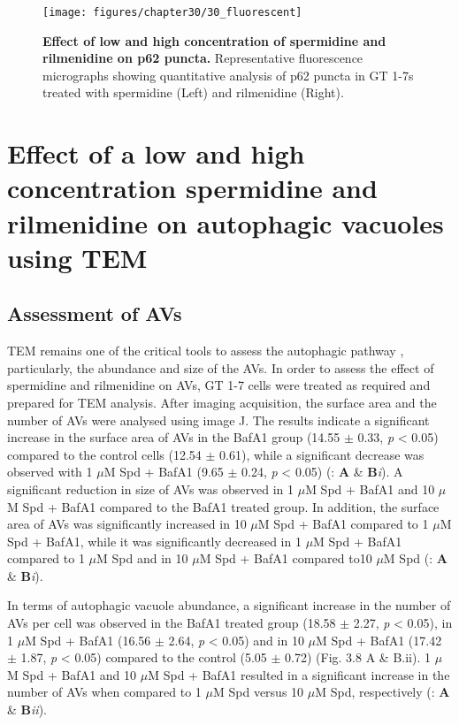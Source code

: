 {\begin{figure}[!htbp]
\center
  \texttt{[image: figures/chapter30/30\_fluorescent]}
  \caption[Effect of low and high concentration of spermidine and rilmenidine on p62 puncta - fluorescence micrographs]{\textbf{Effect of low and high concentration of spermidine and rilmenidine on p62 puncta.} Representative fluorescence micrographs showing quantitative analysis of p62 puncta in GT 1-7s treated with spermidine (Left) and rilmenidine (Right).}
  \label{fig:30_fluorescent}
\end{figure} 

\section{Effect of a low and high concentration spermidine and rilmenidine on autophagic vacuoles using TEM}
\subsection{Assessment of AVs}

TEM remains one of the critical tools to assess the autophagic pathway \citep{klionsky2016}, particularly, the abundance and size of the AVs.  In order to assess the effect of spermidine and rilmenidine on AVs, GT 1-7 cells were treated as required and prepared for TEM analysis. After imaging acquisition, the surface area and the number of AVs were analysed using image J. The results indicate a significant increase in the surface area of AVs in the BafA1 group (14.55 $\pm$ 0.33, \textit{p} < 0.05) compared to the control cells (12.54 $\pm$ 0.61), while a significant decrease was observed with 1 $\mu$M Spd + BafA1 (9.65 $\pm$ 0.24, \textit{p} < 0.05) (: \textbf{A} \& \textbf{B}\textit{i}).  A significant reduction in size of AVs was observed in 1 $\mu$M Spd + BafA1 and 10 $\mu$M Spd + BafA1 compared to the BafA1 treated group. In addition, the surface area of AVs was significantly increased in 10 $\mu$M Spd + BafA1 compared to 1 $\mu$M Spd + BafA1, while it was significantly decreased in 1 $\mu$M Spd + BafA1 compared to 1 $\mu$M Spd and in 10 $\mu$M Spd + BafA1 compared to10 $\mu$M Spd (: \textbf{A} \& \textbf{B}\textit{i}). 
 
In terms of autophagic vacuole abundance, a significant increase in the number of AVs per cell was observed in the BafA1 treated group (18.58 $\pm$ 2.27, \textit{p} < 0.05), in 1 $\mu$M Spd + BafA1 (16.56 $\pm$ 2.64, \textit{p} < 0.05) and in 10 $\mu$M Spd + BafA1 (17.42 $\pm$ 1.87, \textit{p} < 0.05) compared to the control (5.05 $\pm$ 0.72) (Fig. 3.8 A \& B.ii). 1 $\mu$M Spd + BafA1 and 10 $\mu$M Spd + BafA1 resulted in a significant increase in the number of AVs when compared to 1 $\mu$M Spd versus 10 $\mu$M Spd, respectively (: \textbf{A} \& \textbf{B}\textit{ii}).

}
